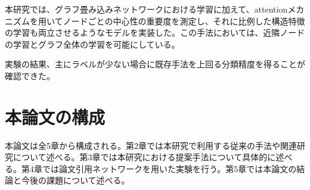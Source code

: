 本研究では、グラフ畳み込みネットワークにおける学習に加えて、attentionメカニズムを用いてノードごとの中心性の重要度を測定し、それに比例した構造特徴の学習も両立させるようなモデルを実装した。この手法においては、近隣ノードの学習とグラフ全体の学習を可能にしている。

実験の結果、主にラベルが少ない場合に既存手法を上回る分類精度を得ることが確認できた。

\section{本論文の構成}
本論文は全5章から構成される。第2章では本研究で利用する従来の手法や関連研究について述べる。第3章では本研究における提案手法について具体的に述べる。第4章では論文引用ネットワークを用いた実験を行う。第5章では本論文の結論と今後の課題について述べる。
